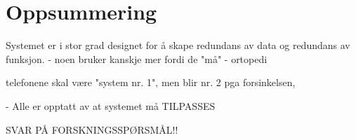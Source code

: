 \section{Oppsummering}
Systemet er i stor grad designet for å skape redundans av data og redundans av funksjon.
- noen bruker kanskje mer fordi de "må" - ortopedi	

telefonene skal være "system nr. 1", men blir nr. 2 pga forsinkelsen,

- Alle er opptatt av at systemet må TILPASSES

SVAR PÅ FORSKNINGSSPØRSMÅL!!
